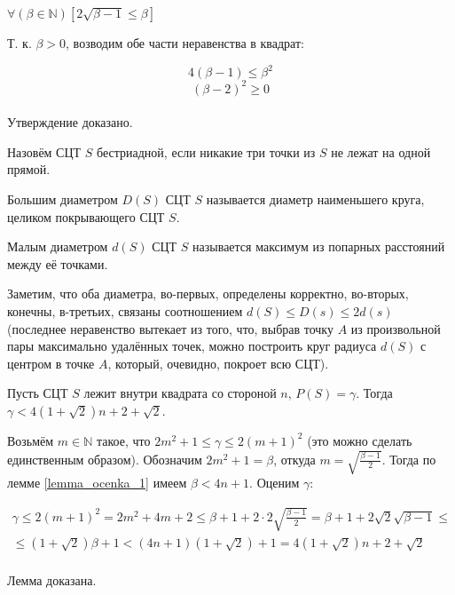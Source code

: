 \begin{utverzhd}[вспомогательное]
	$\forall \left(\beta \in \mathbb N\right)\left[  2 \sqrt{\beta - 1} \leq \beta \right]$
\end{utverzhd}

\dokvo
	Т. к. $\beta >0$, возводим обе части неравенства в квадрат:

	$$4 (\beta - 1) \leq \beta^2$$
	$$ (\beta-2)^2 \geq 0$$
\\ Утверждение доказано.

\begin{opr}
	Назовём СЦТ $S$ бестриадной, если никакие три точки из $S$ не лежат на одной прямой.
\end{opr}

\begin{opr}
	Большим диаметром $D(S)$ СЦТ $S$ называется диаметр наименьшего круга, целиком покрывающего СЦТ $S$.
\end{opr}

\begin{opr}
	Малым диаметром $d(S)$ СЦТ $S$ называется максимум из попарных расстояний между её точками.
\end{opr}

Заметим, что оба диаметра, во-первых, определены корректно, во-вторых, конечны, в-третьих, связаны соотношением $d(S)\leq D(s) \leq 2d(s)$ (последнее неравенство вытекает из того, что, выбрав точку $A$ из произвольной пары максимально удалённых точек, можно построить круг радиуса $d(S)$ с центром в точке $A$, который, очевидно, покроет всю СЦТ).


\begin{lemma}
	Пусть СЦТ $S$ лежит внутри квадрата со стороной $n$, $P(S)=\gamma$.
	Тогда $\gamma<4(1+\sqrt{2})n+2+\sqrt{2}$.
\end{lemma}

\dokvo
	Возьмём $m \in \mathbb{N}$ такое, что $2m^2+1 \le \gamma \le 2(m+1)^2$ (это можно сделать единственным образом).
	Обозначим $2m^2+1=\beta$, откуда $m=\sqrt{\frac{\beta-1}{2}}$. Тогда по лемме \ref{lemma_ocenka_1} имеем $ \beta < 4n + 1$. Оценим $\gamma$:

	\begin{multline}
		\gamma \leq 2(m+1)^2 = 2m^2+4m +2 \leq
		\beta + 1 + 2 \cdot 2 \sqrt{\frac{\beta-1}{2}} =
		\beta + 1 +2\sqrt{2}\sqrt{\beta-1} \leq
		\\ \leq
		(1+\sqrt{2})\beta+1 <
		(4n+1)(1+\sqrt{2})+1 =
		4(1+\sqrt{2})n+2+\sqrt{2}
	\end{multline}
\\ Лемма доказана.


